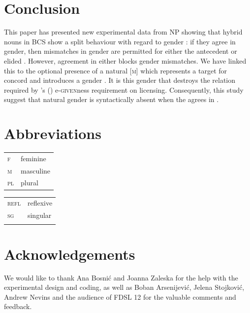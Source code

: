 \documentclass[output=paper,modfonts,newtxmath,hidelinks]{langscibook}
\begin{document}
			
			\section{Conclusion}	
			
			This paper has presented new experimental data from  NP  showing that hybrid nouns in BCS show a split behaviour with regard to gender : if they agree in  gender, then mismatches in  gender are permitted for either the antecedent or elided . However,  agreement in either  blocks gender mismatches. We have linked this to the optional presence of a natural [\textsc{m}]  which represents a target for  concord and introduces a gender .
			It is this gender  that destroys the  relation required by \citeauthor{merchant2001}'s (\citeyear{merchant2001}) e-\textsc{given}ness requirement on  licensing.
			Consequently,  this study suggest that natural  gender is syntactically absent when the  agrees in .
		
		
    
    
\section*{Abbreviations}

\begin{tabularx}{.5\textwidth}{@{}lQ@{}}
\textsc{f}&{feminine}\\
\textsc{m}&{masculine}\\
\textsc{pl}&{plural}\\
\end{tabularx}%
\begin{tabularx}{.5\textwidth}{@{}lQ@{}}
\textsc{refl}&reflexive\\
\textsc{sg}&singular\\
&\\
\end{tabularx}



\section*{Acknowledgements}

We would like to thank Ana Bosni\'{c} and Joanna Zaleska for the help with the experimental design and coding, as well as Boban Arsenijevi\'{c}, Jelena Stojkovi\'{c}, Andrew Nevins and the audience of FDSL 12 for the valuable comments and feedback.   
\end{document}

